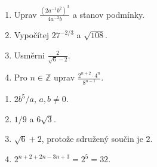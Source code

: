 \documentclass[11pt,a4paper]{article}
\begin{document}
\begin{zadaniReseniBox}[title={Domácí opakování před průběžným ověřením},breakable=false]
\begin{enumerate}[label=\alph*)]
\item Uprav $\frac{(2a^{-1}b^2)^3}{4a^{-2}b}$ a stanov podmínky.
\item Vypočítej $27^{-2/3}$ a $\sqrt{108}$.
\item Usměrni $\frac2{\sqrt6-2}$.
\item Pro $n\in\mathbb Z$ uprav $\frac{2^{n+2}\cdot4^n}{8^{n-1}}$.
\end{enumerate}
\tcblower
\begin{enumerate}[label=\alph*)]
\item $2b^5/a$, $a,b\ne0$.
\item $1/9$ a $6\sqrt3$.
\item $\sqrt6+2$, protože sdružený součin je $2$.
\item $2^{n+2+2n-3n+3}=2^5=32$.
\end{enumerate}
\end{zadaniReseniBox}
\end{document}
